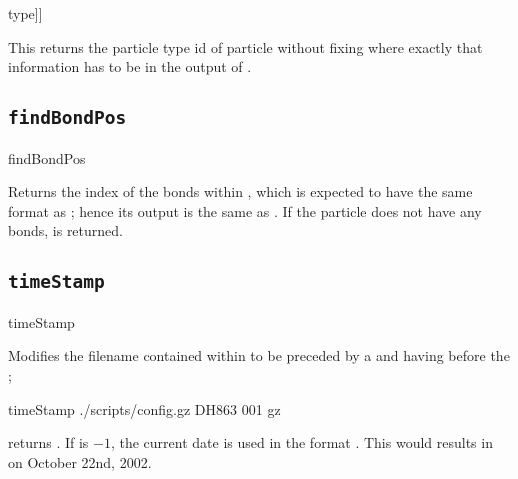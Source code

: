 \begin{tclcode}
[lindex [part $i] [findPropPos [part $i] type]]
\end{tclcode}
This returns the particle type id of particle  without fixing
where exactly that information has to be in the output of 
\codebox{[part \$i]}.

\subsection{\texttt{findBondPos}}
\begin{essyntax}
  findBondPos 
\end{essyntax}

Returns the index of the bonds within ,
which is expected to have the same format as ; hence its output is the same as
. If the
particle does not have any bonds,  is returned.

\subsection{\texttt{timeStamp}}
\begin{essyntax}
  timeStamp    
\end{essyntax}
Modifies the filename contained within  to be preceded by a
 and having  before the ; \eg
\begin{tclcode}
  timeStamp ./scripts/config.gz DH863 001 gz
\end{tclcode}
returns .  If  is $-1$,
the current date is used in the format . This would
results in  on October 22nd,
2002.

